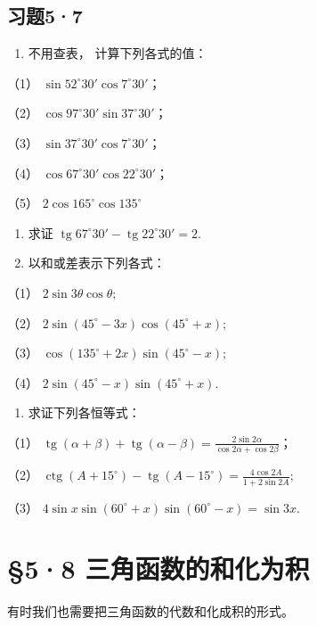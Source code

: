 \subsection{习题5·7}

\begin{enumerate}
\item
  不用查表， 计算下列各式的值：
\end{enumerate}

（1） \(\sin52^{\circ}30'\cos7^{\circ}30'\)；

（2） \(\cos 97^{\circ}30'\sin 37^{\circ}30'\)；

（3） \(\sin 37^{\circ}30'\cos 7^{\circ}30'\)；

（4） \(\cos 67^{\circ}30'\cos 22^{\circ}30'\)；

（5） \(2\cos165^{\circ}\cos135^{\circ}\)

\begin{enumerate}[start=2]
\item
  求证
  \(\operatorname{tg} 67^{\circ}30' - \operatorname{tg} 22^{\circ}30' = 2\).
\item
  以和或差表示下列各式：
\end{enumerate}

（1） \(2 \sin 3\theta \cos \theta;\)

（2） \(2\sin (45^{\circ} - 3x)\cos (45^{\circ} + x);\)

（3） \(\cos (135^{\circ} + 2x)\sin (45^{\circ} - x);\)

（4） \(2\sin (45^{\circ} - x)\sin (45^{\circ} + x)\).

\begin{enumerate}[start=4]
\item
  求证下列各恒等式：
\end{enumerate}

（1）
\(\operatorname{tg}(\alpha + \beta) + \operatorname{tg}(\alpha - \beta) = \frac{2\sin 2\alpha}{\cos 2\alpha + \cos 2\beta}\)；

（2）
\(\operatorname{ctg}(A + 15^{\circ}) - \operatorname{tg}(A - 15^{\circ}) = \frac{4\cos 2A}{1 + 2\sin 2A};\)

（3） \(4\sin x\sin (60^{\circ} + x)\sin (60^{\circ} - x) = \sin 3x.\)

\section{§5·8 三角函数的和化为积}

有时我们也需要把三角函数的代数和化成积的形式。


